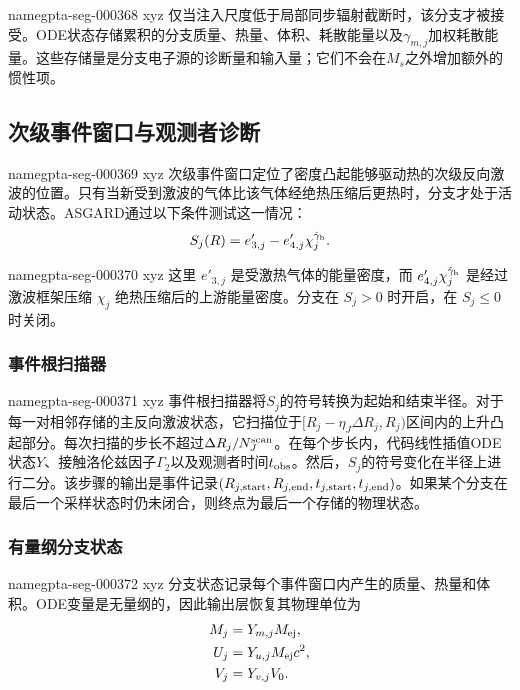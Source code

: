 \documentclass[twocolumn]{aastex702}
\makeatletter
\providecommand{\gptareaderanchor}[1]{\pdfdest name{#1} xyz}%
\providecommand{\gptareaderanchor}[1]{\special{pdf:dest (#1) [ @thispage /XYZ @xpos @ypos null ]}}%
\makeatother
\begin{document}
\gptareaderanchor{gpta-seg-000368}%
仅当注入尺度低于局部同步辐射截断时，该分支才被接受。ODE状态存储累积的分支质量、热量、体积、耗散能量以及\(\gamma_{m,j}\)加权耗散能量。这些存储量是分支电子源的诊断量和输入量；它们不会在\(M_s\)之外增加额外的惯性项。

\subsection{次级事件窗口与观测者诊断}


\gptareaderanchor{gpta-seg-000369}%
次级事件窗口定位了密度凸起能够驱动热的次级反向激波的位置。只有当新受到激波的气体比该气体经绝热压缩后更热时，分支才处于活动状态。ASGARD通过以下条件测试这一情况：
\begin{equation}
S_j(R)=e'_{3,j}-e'_{4,j}\chi_j^{\hat\gamma_{\rm h}}.
\end{equation}

\gptareaderanchor{gpta-seg-000370}%
这里 \(e'_{3,j}\) 是受激热气体的能量密度，而 \(e'_{4,j}\chi_j^{\hat\gamma_{\rm h}}\) 是经过激波框架压缩 \(\chi_j\) 绝热压缩后的上游能量密度。分支在 \(S_j>0\) 时开启，在 \(S_j\le0\) 时关闭。

\subsubsection{事件根扫描器}


\gptareaderanchor{gpta-seg-000371}%
事件根扫描器将\(S_j\)的符号转换为起始和结束半径。对于每一对相邻存储的主反向激波状态，它扫描位于\([R_j-\eta_J\Delta R_j,R_j)\)区间内的上升凸起部分。每次扫描的步长不超过\(\Delta R_j/N_J^{\rm scan}\)。在每个步长内，代码线性插值ODE状态\(Y\)、接触洛伦兹因子\(\Gamma_2\)以及观测者时间\(t_{\rm obs}\)。然后，\(S_j\)的符号变化在半径上进行二分。该步骤的输出是事件记录\((R_{j,\rm start},R_{j,\rm end},t_{j,\rm start},t_{j,\rm end})\)。如果某个分支在最后一个采样状态时仍未闭合，则终点为最后一个存储的物理状态。

\subsubsection{有量纲分支状态}


\gptareaderanchor{gpta-seg-000372}%
分支状态记录每个事件窗口内产生的质量、热量和体积。ODE变量是无量纲的，因此输出层恢复其物理单位为
\begin{equation}
\begin{aligned}
M_j&=Y_{m,j}M_{\rm ej},\\
U_j&=Y_{u,j}M_{\rm ej}c^2,\\
V_j&=Y_{v,j}V_0.
\end{aligned}
\end{equation}
\end{document}
